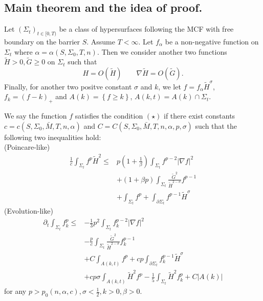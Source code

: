 \subsection{Main theorem and the idea of proof.}

Let $\left( \Sigma _t \right) _{t \in [0,T)}$ be a class of hypersurfaces following the MCF with free boundary on the barrier $S$. Assume $T<\infty $. Let $f_{\alpha }$ be a non-negative function on $\Sigma _t$ where $\alpha = \alpha (S, \Sigma _0,T,n)$. Then we consider another two functions $\tilde{H}>0,\tilde{G}\geq 0$ on $\Sigma _t$ such that 
\[
    H=O(\tilde{H}) \qquad \nabla \tilde{H}=O(\tilde{G}).    
\]
Finally, for another two positve constant $\sigma$ and $k$, we let $f=f_{\alpha }\tilde{H}^{\sigma }$, $f_k=\left( f-k \right) _{+}$ and $A(k)=\left\{ f \geq k \right\} $, $A(k,t)=A(k)\cap \Sigma _t$.

We say the function $f$ satisfies the condition $(\star)$ if there exist constants $c=c(S, \Sigma_0,\bar{M},T,n,\alpha )$ and $C=C(S,\Sigma _0,\bar{M},T,n,\alpha ,p,\sigma )$ such that the following two inequalities hold:\\
(Poincare-like)
\begin{equation} \label{PLE}
\begin{split}
    \frac{1}{c}\int_{\Sigma_t} f^p \tilde{H}^2 
\leq &  p \left( 1+\frac{1}{\beta } \right) \int_{\Sigma_t} f^{p-2}\left| \nabla f \right| ^2  \\
&+\left( 1+\beta p \right) \int_{\Sigma_t} \frac{\tilde{G}^2}{\tilde{H}^{2-\sigma }}f^{p-1}\\
&+\int_{\Sigma_t} f^p+\int_{\partial \Sigma_t} f^{p-1}\tilde{H}^{\sigma }
\end{split}
\end{equation}
(Evolution-like)
\begin{equation} \label{ELE}
    \begin{split}
        \partial_t \int_{\Sigma_t} f_k^p
    \leq &  -\frac{1}{3}p^2 \int_{\Sigma_t} f_{k}^{p-2}\left| \nabla f \right| ^2  \\
    &-\frac{p}{c} \int_{\Sigma_t} \frac{\tilde{G}^2}{\tilde{H}^{2-\sigma }}f_{k}^{p-1}\\
    &+C \int_{A(k,t)} f^p+cp\int_{\partial \Sigma_t} f_{k}^{p-1}\tilde{H}^{\sigma }\\
    &+cp \sigma \int_{A(k,t)}^{}\tilde{H}^2f^p-\frac{1}{5}\int_{\Sigma_t} \tilde{H}^2f_{k}^{p}+C \left| A(k) \right| 
    \end{split}
    \end{equation}
for any $p>p_0(n,\alpha ,c), \sigma <\frac{1}{2}, k>0, \beta >0$. 

